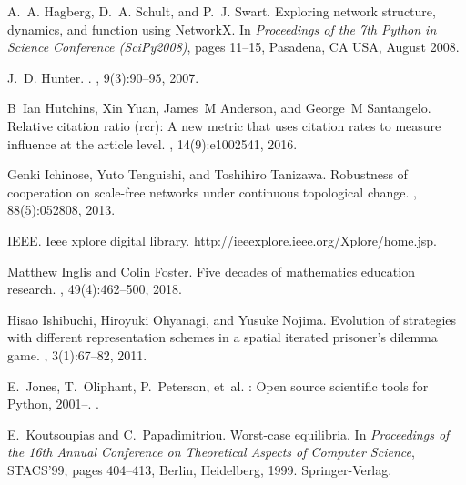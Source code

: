 \documentclass{article}
\theoremstyle{definition}
\begin{document}
\begin{thebibliography}{10}
    A.~A. Hagberg, D.~A. Schult, and P.~J. Swart.
    \newblock Exploring network structure, dynamics, and function using {NetworkX}.
    \newblock In {\em Proceedings of the 7th Python in Science Conference
      (SciPy2008)}, pages 11--15, Pasadena, CA USA, August 2008.
    
    J.~D. Hunter.
    .
    , 9(3):90--95, 2007.
    
    B~Ian Hutchins, Xin Yuan, James~M Anderson, and George~M Santangelo.
    \newblock Relative citation ratio (rcr): A new metric that uses citation rates
      to measure influence at the article level.
    , 14(9):e1002541, 2016.
    
    Genki Ichinose, Yuto Tenguishi, and Toshihiro Tanizawa.
    \newblock Robustness of cooperation on scale-free networks under continuous
      topological change.
    , 88(5):052808, 2013.
    
    IEEE.
    \newblock Ieee xplore digital library.
    \newblock http://ieeexplore.ieee.org/Xplore/home.jsp.
    
    Matthew Inglis and Colin Foster.
    \newblock Five decades of mathematics education research.
    , 49(4):462--500,
      2018.
    
    Hisao Ishibuchi, Hiroyuki Ohyanagi, and Yusuke Nojima.
    \newblock Evolution of strategies with different representation schemes in a
      spatial iterated prisoner's dilemma game.
    , 3(1):67--82, 2011.
    
    E.~Jones, T.~Oliphant, P.~Peterson, et~al.
    : Open source scientific tools for {Python}, 2001--.
    .
    
    E.~Koutsoupias and C.~Papadimitriou.
    \newblock Worst-case equilibria.
    \newblock In {\em Proceedings of the 16th Annual Conference on Theoretical
      Aspects of Computer Science}, STACS'99, pages 404--413, Berlin, Heidelberg,
      1999. Springer-Verlag.
    

\end{thebibliography}
\end{document}
